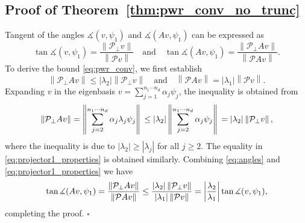 \documentclass[10pt,preprint]{elsarticle}
\newenvironment{proof}{{\noindent \bf \em Proof:}}{\hfill$\square$}
\def\P{\mathcal{P}}
\begin{document}
\begin{appendices}
\section{Proof of Theorem~\ref{thm:pwr_conv_no_trunc}}
\label{sec:proofpwr}
\begin{proof}
Tangent of the angles $\measuredangle(v,\psi_1)$ and $\measuredangle(Av,\psi_1)$ can be expressed as 
\begin{equation}
\label{eq:angles}
\tan\measuredangle(v,\psi_1) = \frac{\left\|\P_{\perp} v\right\|}{\left\|\P v\right\|} \quad \text{and} \quad \tan\measuredangle(Av,\psi_1) = \frac{\left\|\P_{\perp} Av\right\|}{\left\|\P Av\right\|}. 
\end{equation} 
To derive the bound \eqref{eq:pwr_conv}, we first establish
\begin{equation} \label{eq:projector1_properties}
\left\| \P_{\perp} Av \right\| \leq  |\lambda_2|\left\|\P_{\perp} v\right\|
\quad \text{and} \quad 
\left\| \P Av \right\| = |\lambda_1|\left\|\P v\right\|. 
\end{equation} 
Expanding $v$ in the eigenbasis $v = \displaystyle\sum_{j=1}^{n_1 \cdots n_d} \alpha_j\psi_j$, 
the inequality is obtained from 
\begin{equation}
        \left\|\P_{\perp}A v\right\| = 
         \left\| \sum_{j=2}^{n_1\cdots n_d} \alpha_j \lambda_j \psi_j \right\| \\
        \leq |\lambda_2| \left\| \sum_{j=2}^{n_1\cdots n_d} \alpha_j \psi_j \right\| \\
        = |\lambda_2| \left\| \P_{\perp} v \right\|, 
\end{equation}
where the inequality is due to $|\lambda_2|\geq|\lambda_j|$ for all $j \geq 2$. The equality in \eqref{eq:projector1_properties} is obtained similarly. 
Combining \eqref{eq:angles} and \eqref{eq:projector1_properties} we have 
\begin{equation} \label{eq:power_ratio1}
    \tan\measuredangle(Av,\psi_1) 
    = \frac{\left\|\P_{\perp} Av\right\|}{\left\|\P Av\right\|} 
    \leq \frac{|\lambda_2|\left\|\P_{\perp} v\right\|}{|\lambda_1| \left\|\P v\right\|} \\
    = \left|\frac{\lambda_2} {\lambda_1} \right|\tan\measuredangle(v,\psi_1), 
\end{equation}
completing the proof. 
\end{proof}


\end{appendices}
\end{document}
